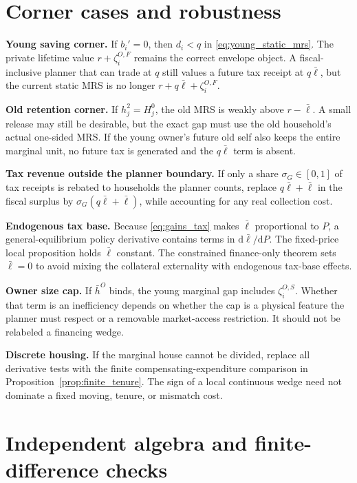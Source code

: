 \documentclass[11pt]{article}
\newcommand{\dd}{\mathrm d}
\newcommand{\1}{\mathbf 1}
\newcommand{\ellbar}{\bar\ell}
\begin{document}
\appendix
\section{Corner cases and robustness}

\textbf{Young saving corner.} If $b_i'=0$, then $d_i<q$ in
\eqref{eq:young_static_mrs}. The private lifetime value
$r+\zeta_i^{O,F}$ remains the correct envelope object. A fiscal-inclusive
planner that can trade at $q$ still values a future tax receipt at $q\ellbar$,
but the current static MRS is no longer $r+q\ellbar+\zeta_i^{O,F}$.

\textbf{Old retention corner.} If $h_j^2=H_j^0$, the old MRS is weakly above
$r-\ellbar$. A small release may still be desirable, but the exact gap must use
the old household's actual one-sided MRS. If the young owner's future old self
also keeps the entire marginal unit, no future tax is generated and the
$q\ellbar$ term is absent.

\textbf{Tax revenue outside the planner boundary.} If only a share
$\sigma_G\in[0,1]$ of tax receipts is rebated to households the planner counts,
replace $q\ellbar+\ellbar$ in the fiscal surplus by
$\sigma_G(q\ellbar+\ellbar)$, while accounting for any real collection cost.

\textbf{Endogenous tax base.} Because \eqref{eq:gains_tax} makes
$\ellbar$ proportional to $P$, a general-equilibrium policy derivative contains
terms in $\dd\ellbar/\dd P$. The fixed-price local proposition holds
$\ellbar$ constant. The constrained finance-only theorem sets $\ellbar=0$ to
avoid mixing the collateral externality with endogenous tax-base effects.

\textbf{Owner size cap.} If $\bar h^O$ binds, the young marginal gap includes
$\zeta_i^{O,S}$. Whether that term is an inefficiency depends on whether the cap
is a physical feature the planner must respect or a removable market-access
restriction. It should not be relabeled a financing wedge.

\textbf{Discrete housing.} If the marginal house cannot be divided, replace
all derivative tests with the finite compensating-expenditure comparison in
Proposition~\ref{prop:finite_tenure}. The sign of a local continuous wedge need
not dominate a fixed moving, tenure, or mismatch cost.

\section{Independent algebra and finite-difference checks}
\end{document}
